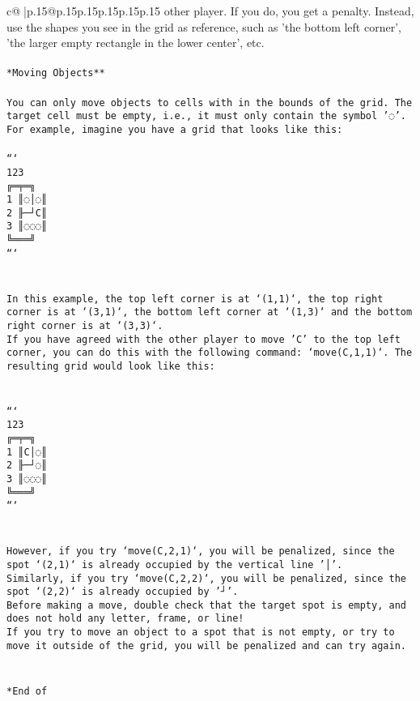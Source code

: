 \documentclass{article}
\begin{document}
{\begin{supertabular}{c@{$\;$}|p{.15\linewidth}@{}p{.15\linewidth}p{.15\linewidth}p{.15\linewidth}p{.15\linewidth}p{.15\linewidth}}
{{{other player. If you do, you get a penalty. Instead, use the shapes you see in the grid as reference, such as 'the bottom left corner', 'the larger empty rectangle in the lower center', etc.\\ \tt \\ \tt **Moving Objects**\\ \tt \\ \tt * You can only move objects to cells with in the bounds of the grid. The target cell must be empty, i.e., it must only contain the symbol '◌'.\\ \tt * For example, imagine you have a grid that looks like this: \\ \tt \\ \tt ```\\ \tt     123\\ \tt    ╔═╤═╗\\ \tt  1 ║◌│◌║\\ \tt  2 ╟─┘C║\\ \tt  3 ║◌◌◌║\\ \tt    ╚═══╝\\ \tt ```\\ \tt \\ \tt \\ \tt * In this example, the top left corner is at `(1,1)`, the top right corner is at `(3,1)`, the bottom left corner at `(1,3)` and the bottom right corner is at `(3,3)`.\\ \tt * If you have agreed with the other player to move 'C' to the top left corner, you can do this with the following command: `move(C,1,1)`. The resulting grid would look like this: \\ \tt \\ \tt \\ \tt ```\\ \tt     123\\ \tt    ╔═╤═╗\\ \tt  1 ║C│◌║\\ \tt  2 ╟─┘◌║\\ \tt  3 ║◌◌◌║\\ \tt    ╚═══╝\\ \tt ```\\ \tt \\ \tt \\ \tt * However, if you try `move(C,2,1)`, you will be penalized, since the spot `(2,1)` is already occupied by the vertical line '│'.\\ \tt * Similarly, if you try `move(C,2,2)`, you will be penalized, since the spot `(2,2)` is already occupied by '┘'.\\ \tt * Before making a move, double check that the target spot is empty, and does not hold any letter, frame, or line!\\ \tt * If you try to move an object to a spot that is not empty, or try to move it outside of the grid, you will be penalized and can try again.\\ \tt \\ \tt \\ \tt **End of }}}
\end{supertabular}}
\end{document}
